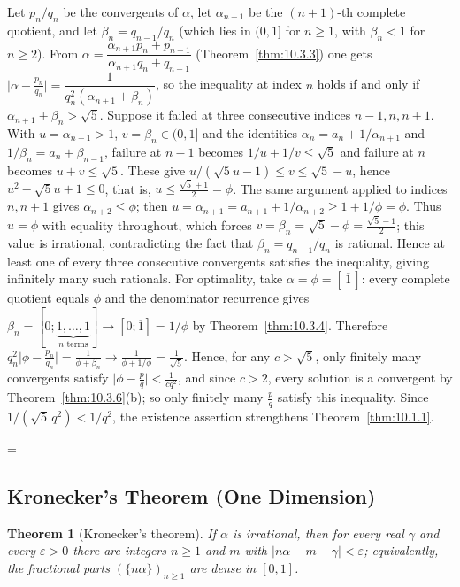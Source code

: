 \documentclass[11pt]{article}
\makeatletter
\theoremstyle{ntstyle}
\newtheorem{theorem}{Theorem}[subsection]
\let\nt@closedisplay\]
\def\nt@guardedclose{\@ifnextchar\par{\nt@closeafterpar}{\@ifnextchar\end{\postdisplaypenalty\@M\nt@closedisplay}{\nt@closedisplay}}}
\def\nt@closeafterpar\par{\@ifnextchar\par{\nt@closeafterpar}{\@ifnextchar\end{\postdisplaypenalty\@M\nt@closedisplay\par}{\nt@closedisplay\par}}}
\renewenvironment{proof}[1][\proofname]{\par
  \pushQED{\qed}\normalfont\topsep\medskipamount\edef\nt@afterproof{\@endparpenalty=\the\@endparpenalty\relax}\@beginparpenalty\@M\@endparpenalty\@M\let\]\nt@guardedclose\trivlist\item[]\textit{#1\@addpunct{.}} \ignorespaces}{\ifvmode\addpenalty\@M\fi\popQED\nt@afterproof\endtrivlist\@endpefalse}
\makeatother
\begin{document}
\begin{proof} Let $p_n/q_n$ be the convergents of
	$\alpha$, let $\alpha_{n+1}$ be the $(n+1)$-th complete quotient, and let
	$\beta_n=q_{n-1}/q_n$ (which lies in $(0,1]$ for $n\ge1$, with
	$\beta_n<1$ for $n\ge2$). From
	$\alpha=\dfrac{\alpha_{n+1}p_n+p_{n-1}}{\alpha_{n+1}q_n+q_{n-1}}$
	(Theorem~\ref{thm:10.3.3}) one gets
	$\big|\alpha-\tfrac{p_n}{q_n}\big|=\dfrac{1}{q_n^2(\alpha_{n+1}+\beta_n)}$,
	so the inequality at index $n$ holds if and only if
	$\alpha_{n+1}+\beta_n>\sqrt{5}$. Suppose it failed at three consecutive
	indices $n-1,n,n+1$. With $u=\alpha_{n+1}>1$, $v=\beta_n\in(0,1]$
	and the identities $\alpha_n=a_n+1/\alpha_{n+1}$ and $1/\beta_n=a_n+\beta_{n-1}$,
	failure at $n-1$ becomes $1/u+1/v\le\sqrt{5}$ and failure at $n$
	becomes $u+v\le\sqrt{5}$. These give $u/(\sqrt{5}u-1)\le v\le\sqrt{5}-u$,
	hence $u^2-\sqrt{5}u+1\le0$, that is, $u\le\tfrac{\sqrt{5}+1}{2}=\phi$. The
	same argument applied to indices $n,n+1$ gives $\alpha_{n+2}\le\phi$;
	then $u=\alpha_{n+1}=a_{n+1}+1/\alpha_{n+2}\ge1+1/\phi=\phi$. Thus
	$u=\phi$ with equality throughout, which forces
	$v=\beta_n=\sqrt{5}-\phi=\tfrac{\sqrt{5}-1}{2}$; this value is irrational,
	contradicting the fact that $\beta_n=q_{n-1}/q_n$ is rational. Hence at least
	one of every three consecutive convergents satisfies the inequality,
	giving infinitely many such rationals. For optimality, take
	$\alpha=\phi=[\,\overline1\,]$: every complete quotient equals $\phi$
	and the denominator recurrence gives
	$\beta_n=[0;\underbrace{1,\ldots,1}_{n\text{ terms}}]\to[0;\overline1]=1/\phi$
	by Theorem~\ref{thm:10.3.4}. Therefore
	$q_n^2\big|\phi-\tfrac{p_n}{q_n}\big|=\tfrac{1}{\phi+\beta_n}\to\tfrac{1}{\phi+1/\phi}=\tfrac{1}{\sqrt{5}}$.
	Hence, for any $c>\sqrt{5}$, only finitely many convergents satisfy
	$\big|\phi-\tfrac{p}{q}\big|<\tfrac{1}{cq^2}$, and since $c>2$, every
	solution is a convergent by Theorem~\ref{thm:10.3.6}(b); so only finitely many
	$\tfrac{p}{q}$ satisfy this inequality.
	Since $1/(\sqrt{5}\,q^2)<1/q^2$, the existence assertion strengthens
	Theorem~\ref{thm:10.1.1}.

\end{proof}
\subsection{Kronecker's Theorem (One Dimension)}

\begin{theorem}[Kronecker's theorem]\label{thm:10.6.1} If $\alpha$ is
	irrational, then for every real $\gamma$ and every $\varepsilon>0$
	there are integers $n\ge1$ and $m$ with
	$|n\alpha-m-\gamma|<\varepsilon$; equivalently, the fractional parts
	$(\{n\alpha\})_{n\ge1}$ are dense in $[0,1]$.

\end{theorem}
\end{document}
